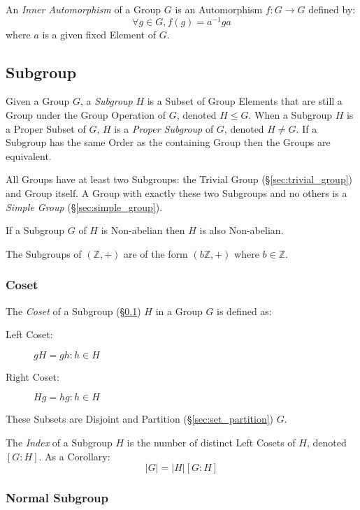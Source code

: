 An \emph{Inner Automorphism} of a Group $G$ is an Automorphism $f : G
\rightarrow G$ defined by:
\[
    \forall g \in G, f(g) = a^{-1}ga
\]
where $a$ is a given fixed Element of $G$.



\subsection{Subgroup}\label{sec:subgroup}

Given a Group $G$, a \emph{Subgroup} $H$ is a Subset of Group Elements
that are still a Group under the Group Operation of $G$, denoted $H
\leq G$. When a Subgroup $H$ is a Proper Subset of $G$, $H$ is a
\emph{Proper Subgroup} of $G$, denoted $H \neq G$. If a Subgroup has
the same Order as the containing Group then the Groups are equivalent.

All Groups have at least two Subgroups: the Trivial Group
(\S\ref{sec:trivial_group}) and Group itself. A Group with exactly
these two Subgroups and no others is a \emph{Simple Group}
(\S\ref{sec:simple_group}).

If a Subgroup $G$ of $H$ is Non-abelian then $H$ is also Non-abelian.

The Subgroups of $(\mathbb{Z},+)$ are of the form $(b\mathbb{Z},+)$
where $b \in \mathbb{Z}$.



\subsubsection{Coset}\label{sec:coset}

The \emph{Coset} of a Subgroup (\S\ref{sec:subgroup}) $H$ in a Group
$G$ is defined as:
\begin{description}
\item[Left Coset:] $gH = {gh : h \in H}$
\item[Right Coset:] $Hg = {hg : h \in H}$
\end{description}
These Subsets are Disjoint and Partition (\S\ref{sec:set_partition}) $G$.

The \emph{Index} of a Subgroup $H$ is the number of distinct Left
Cosets of $H$, denoted $[G:H]$. As a Corollary:
\[
    |G| = |H|[G:H]
\]



\subsubsection{Normal Subgroup}\label{sec:normal_subgroup}

